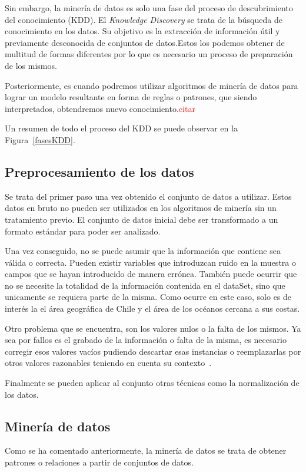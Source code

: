 Sin embargo, la minería de datos es solo una fase del proceso de descubrimiento del conocimiento (KDD). El \emph{Knowledge Discovery} se trata de la búsqueda de conocimiento en los datos. Su objetivo es la extracción de información útil y previamente desconocida de conjuntos de datos.Estos los podemos obtener de multitud de formas diferentes por lo que es necesario un proceso de preparación de los mismos.

Posteriormente, es cuando podremos utilizar algoritmos de minería de datos para lograr un modelo resultante en forma de reglas o patrones, que siendo interpretados, obtendremos nuevo conocimiento.\textcolor{red}{citar}

Un resumen de todo el proceso del KDD se puede observar en la Figura~\ref{fasesKDD}.

\label{fasesKDD}

\subsection{Preprocesamiento de los datos}
Se trata del primer paso una vez obtenido el conjunto de datos a utilizar. Estos datos en bruto no pueden ser utilizados en los algoritmos de minería sin un tratamiento previo. El conjunto de datos inicial debe ser transformado a un formato estándar para poder ser analizado.

Una vez conseguido, no se puede asumir que la información que contiene sea válida o correcta. Pueden existir variables que introduzcan ruido en la muestra o campos que se hayan introducido de manera errónea. También puede ocurrir que no se necesite la totalidad de la información contenida en el dataSet, sino que unicamente se requiera parte de la misma. Como ocurre en este caso, solo es de interés la el área geográfica de Chile y el área de los océanos cercana a sus costas.

Otro problema que se encuentra, son los valores nulos o la falta de los mismos. Ya sea por fallos es el grabado de la información o falta de la misma, es necesario corregir esos valores vacíos pudiendo descartar esas instancias o reemplazarlas por otros valores razonables teniendo en cuenta su contexto~\cite{libro_mineria}.

Finalmente se pueden aplicar al conjunto otras técnicas como la normalización de los datos.

\subsection{Minería de datos}
Como se ha comentado anteriormente, la minería de datos se trata de obtener patrones o relaciones a partir de conjuntos de datos.

